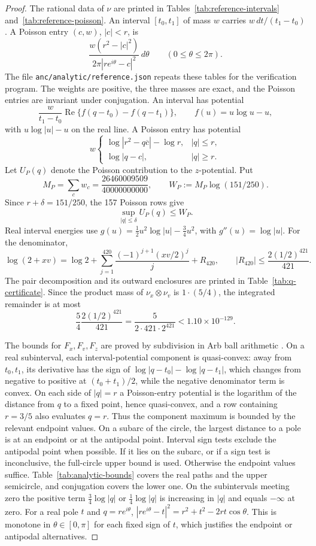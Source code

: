 \documentclass{amsart}
\numberwithin{equation}{section}
\numberwithin{table}{section}
\begin{document}
\begin{proof}
The rational data of $\nu$ are printed in Tables~\ref{tab:reference-intervals}
and~\ref{tab:reference-poisson}. An interval $[t_0,t_1]$ of mass $w$ carries
$w\,dt/(t_1-t_0)$. A Poisson entry
$(c,w)$, $|c|<r$, is
\[
 \frac{w(r^2-|c|^2)}{2\pi|re^{i\theta}-c|^2}\,d\theta
 \qquad(0\le\theta\le2\pi).
\]
The file \nolinkurl{anc/analytic/reference.json} repeats these tables for
the verification program.
The weights are positive, the three masses are exact, and the Poisson
entries are invariant under conjugation. An interval has potential
\[
 \frac{w}{t_1-t_0}\operatorname{Re}\{f(q-t_0)-f(q-t_1)\},\qquad f(u)=u\log u-u,
\]
with $u\log|u|-u$ on the real line. A Poisson entry has potential
\begin{equation}\label{eq:poisson-potential}
 w\begin{cases}
 \log|r^2-q\overline c|-\log r,&|q|\le r,\\
 \log|q-c|,&|q|\ge r.
 \end{cases}
\end{equation}
Let $U_P(q)$ denote the Poisson contribution to the $z$-potential. Put
\[
 M_P=\sum_c w_c=\frac{26460009509}{40000000000},\qquad
 W_P:=M_P\log(151/250).
\]
Since $r+\delta=151/250$, the 157 Poisson rows give
\[
 \sup_{|q|\le\delta}U_P(q)\le W_P.
\]
Real interval energies use $g(u)=\tfrac12u^2\log|u|-\tfrac34u^2$, with
$g''(u)=\log|u|$. For the denominator,
\[
\log(2+xv)=\log2+
\sum_{j=1}^{420}\frac{(-1)^{j+1}(xv/2)^j}{j}+R_{420},
\qquad |R_{420}|\le\frac{2(1/2)^{421}}{421}.
\]
The pair decomposition and its outward enclosures are printed in
Table~\ref{tab:q-certificate}. Since the product mass of $\nu_x\otimes\nu_v$ is $1\cdot(5/4)$,
the integrated remainder is at most
\[
\frac54\frac{2(1/2)^{421}}{421}
=\frac{5}{2\cdot421\cdot2^{421}}<1.10\times10^{-129}.
\]

The bounds for $F_x,F_v,F_z$ are proved by subdivision in Arb ball
arithmetic \cite{Arb}. On a real subinterval, each interval-potential
component is quasi-convex: away from $t_0,t_1$, its derivative has the sign of
$\log|q-t_0|-\log|q-t_1|$, which changes from negative to positive at
$(t_0+t_1)/2$, while the negative denominator term is convex. On each side of $|q|=r$ a
Poisson-entry potential is the logarithm of the distance from $q$ to a fixed
point, hence quasi-convex, and a row containing $r=3/5$ also evaluates $q=r$. Thus the component maximum is
bounded by the relevant endpoint values. On a subarc of the circle, the
largest distance to a pole is at an endpoint or at the antipodal point.
Interval sign tests exclude the antipodal point when possible. If
it lies on the subarc, or if a sign test is inconclusive, the full-circle
upper bound is used. Otherwise the endpoint values suffice. Table~\ref{tab:analytic-bounds}
covers the real paths and the upper semicircle, and conjugation covers the lower one.
On the subintervals
meeting zero the positive term $\frac34\log|q|$ or $\frac14\log|q|$ is
increasing in $|q|$ and equals $-\infty$ at zero. For a real pole $t$ and
$q=re^{i\theta}$,
$|re^{i\theta}-t|^2=r^2+t^2-2rt\cos\theta$. This is monotone in
$\theta\in[0,\pi]$ for each fixed sign of $t$, which justifies the endpoint
or antipodal alternatives.


\end{proof}
\end{document}
